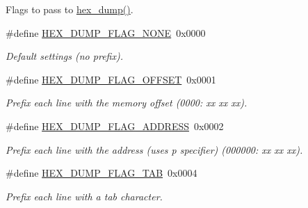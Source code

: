 \label{_amgrp01747264fe7bf50731df0522c351974e}%
Flags to pass to \hyperlink{group__util_gaa321236a0cb6f4e0dad592fdf1b550d2}{hex\-\_\-dump()}. \begin{DoxyCompactItemize}
\item 
\hypertarget{group__hal_gae60f842ae8bc3cc952cdeece611670d5}{\#define \hyperlink{group__hal_gae60f842ae8bc3cc952cdeece611670d5}{H\-E\-X\-\_\-\-D\-U\-M\-P\-\_\-\-F\-L\-A\-G\-\_\-\-N\-O\-N\-E}~0x0000}\label{group__hal_gae60f842ae8bc3cc952cdeece611670d5}

\begin{DoxyCompactList}\small\item\em Default settings (no prefix). \end{DoxyCompactList}\item 
\hypertarget{group__hal_gaec79525addd1a70fda55b1ea11534832}{\#define \hyperlink{group__hal_gaec79525addd1a70fda55b1ea11534832}{H\-E\-X\-\_\-\-D\-U\-M\-P\-\_\-\-F\-L\-A\-G\-\_\-\-O\-F\-F\-S\-E\-T}~0x0001}\label{group__hal_gaec79525addd1a70fda55b1ea11534832}

\begin{DoxyCompactList}\small\item\em Prefix each line with the memory offset (0000\-: xx xx xx). \end{DoxyCompactList}\item 
\hypertarget{group__hal_ga967137c51c026d68d03d1668402ec12b}{\#define \hyperlink{group__hal_ga967137c51c026d68d03d1668402ec12b}{H\-E\-X\-\_\-\-D\-U\-M\-P\-\_\-\-F\-L\-A\-G\-\_\-\-A\-D\-D\-R\-E\-S\-S}~0x0002}\label{group__hal_ga967137c51c026d68d03d1668402ec12b}

\begin{DoxyCompactList}\small\item\em Prefix each line with the address (uses p specifier) (000000\-: xx xx xx). \end{DoxyCompactList}\item 
\hypertarget{group__hal_ga696f6553e33cbd20eda34e220ec9939a}{\#define \hyperlink{group__hal_ga696f6553e33cbd20eda34e220ec9939a}{H\-E\-X\-\_\-\-D\-U\-M\-P\-\_\-\-F\-L\-A\-G\-\_\-\-T\-A\-B}~0x0004}\label{group__hal_ga696f6553e33cbd20eda34e220ec9939a}

\begin{DoxyCompactList}\small\item\em Prefix each line with a tab character. \end{DoxyCompactList}\end{DoxyCompactItemize}


